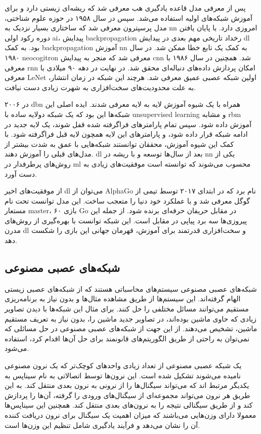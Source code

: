 پس از معرفی مدل  قاعده یادگیری هب معرفی شد که ریشه‌ای زیستی
دارد و برای آموزش شبکه‌های اولیه استفاده می‌شد. سپس در سال ۱۹۵۸ در حوزه علوم
شناختی، مدل پرسپترون معرفی شد که ساختاری بسیار نزدیک به \gls{nn} امروزی دارد. با
پایان یافتن دوره رکود اولی \gls{ai}، پیدایش \gls{backpropagation} رخداد تاریخی
مهم بعدی در پیدایش \gls{dl} بود. به کمک \gls{backpropagation} آموزش \gls{nn} به
کمک یک تابع خطا ممکن شد. در سال ۱۹۸۰ neocogitron معرفی شد که منجر به پیدایش
\gls{cnn} شد. همچنین در سال ۱۹۸۶ با معرفی \gls{rnn} امکان پردازش داده‌های
دنباله‌ای محقق شد. در نهایت در دهه ۹۰ میلادی با معرفی LeNet اولین شبکه عصبی عمیق
معرفی شد. هرچند این شبکه در زمان انتشار، به علت محدودیت‌های سخت‌افزاری به شهرت
زیادی دست نیافت.

در ۲۰۰۶ \gls{dbn} همراه با یک شیوه آموزش لایه به لایه معرفی شدند. ایده اصلی این
شبکه‌ها این بود که یک شبکه دولایه ساده با \gls{unsupervised learning} و مشابه
\gls{rbm} آموزش داده شود. سپس تمام پارامترهای فراگرفته شده قفل شوند، یک لایه
جدید در ادامه شبکه قرار داده شود، و پارامترهای این لایه همچون لایه قبل فراگرفته
شود. با کمک این شیوه آموزش، محققان توانستند شبکه‌هایی با عمق به شدت بیشتر از
مدل‌های قبلی را آموزش دهند. \gls{dl} بعد از سال‌ها توسعه و با ریشه در \gls{nn}
یکی از روش‌های پرطرفدار در \gls{ml} محسوب می‌شوند که توانسته است موفقیت‌های
زیادی به دست آورد.

از موفقیت‌های اخیر \gls{dl} می‌توان از AlphaGo نام برد که در ابتدای ۲۰۱۷ توسط
تیمی از گوگل معرفی شد و با عملکرد خود دنیا را متعجب ساخت. این مدل توانست تحت نام
مستعار master، ۶۰ بازی Go در مقابل حریفان حرفه‌ای برنده شود. از جمله این
پیروزی‌ها سه برد پیاپی در مقابل  است. این شبکه توانست با بهره‌گیری از
روش‌های مدرن \gls{dl} و سخت‌افزاری قدرتمند برای آموزش، قهرمان جهانی این بازی را
شکست دهد.

\subsection{شبکه‌های عصبی مصنوعی}
شبکه‌های عصبی مصنوعی سیستم‌های محاسباتی هستند که از شبکه‌های عصبی زیستی الهام
گرفته‌اند. این سیستم‌ها از طریق مشاهده مثال‌ها و بدون نیاز به برنامه‌ریزی مستقیم
می‌توانند مسائل مختلفی را حل کنند. برای مثال این شبکه‌ها با دیدن تصاویر زیادی که
حاوی ماشین بوده‌اند، در تصاویر جدید ماشین را، بدون نیاز به تعریف مستقیم ماشین،
تشخیص می‌دهند. از این جهت از شبکه‌های عصبی مصنوعی در حل مسائلی که نمی‌توان به
راحتی از طریق الگوریتم‌های قانونمند برای حل آن‌ها اقدام کرد، استفاده می‌شود.

یک شبکه عصبی مصنوعی از تعداد زیادی واحدهای کوچک‌تر که یک نرون مصنوعی نامیده
می‌شوند تشکیل شده است. این نرون‌ها توسط اتصالاتی به نام سیناپس به یکدیگر مرتبط
اند که می‌تواند سیگنال‌ها را از نرونی به نرون بعدی منتقل کند. به این طریق هر
نرون می‌تواند مجموعه‌ای از سیگنال‌های ورودی را گرفته، آن‌ها را پردازش کند و از
طریق سیگنالی نتیجه را به نرون‌های بعدی منتقل کند. همچنین این سیناپس‌ها معمولا
دارای وزن‌هایی می‌باشند که میزان اهمیت یک سیگنال برای نرون دریافت کننده آن را
نشان می‌دهد و فرآیند یادگیری شامل تنظیم این وزن‌ها است.

